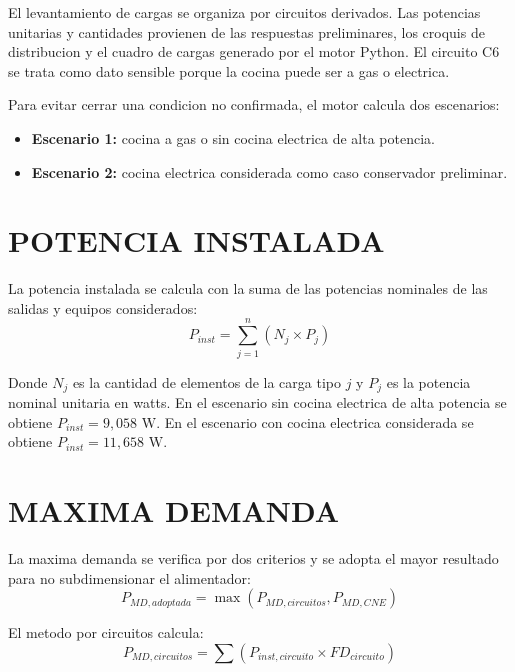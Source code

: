 El levantamiento de cargas se organiza por circuitos derivados. Las potencias unitarias y cantidades provienen de las respuestas preliminares, los croquis de distribucion y el cuadro de cargas generado por el motor Python. El circuito C6 se trata como dato sensible porque la cocina puede ser a gas o electrica.

Para evitar cerrar una condicion no confirmada, el motor calcula dos escenarios:
\begin{itemize}
  \item \textbf{Escenario 1:} cocina a gas o sin cocina electrica de alta potencia.
  \item \textbf{Escenario 2:} cocina electrica considerada como caso conservador preliminar.
\end{itemize}



\section{POTENCIA INSTALADA}

La potencia instalada se calcula con la suma de las potencias nominales de las salidas y equipos considerados:
\begin{equation}
P_{inst}=\sum_{j=1}^{n} \left(N_j \times P_j\right)
\end{equation}

Donde \(N_j\) es la cantidad de elementos de la carga tipo \(j\) y \(P_j\) es la potencia nominal unitaria en watts. En el escenario sin cocina electrica de alta potencia se obtiene \(P_{inst}=9,058\text{ W}\). En el escenario con cocina electrica considerada se obtiene \(P_{inst}=11,658\text{ W}\).

\section{MAXIMA DEMANDA}

La maxima demanda se verifica por dos criterios y se adopta el mayor resultado para no subdimensionar el alimentador:
\begin{equation}
P_{MD,adoptada}=\max\left(P_{MD,circuitos},P_{MD,CNE}\right)
\end{equation}

El metodo por circuitos calcula:
\begin{equation}
P_{MD,circuitos}=\sum \left(P_{inst,circuito}\times FD_{circuito}\right)
\end{equation}

